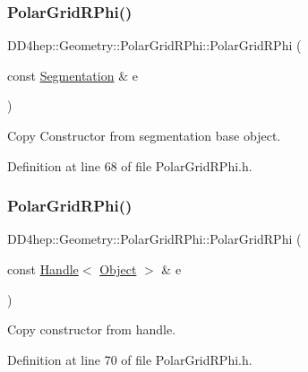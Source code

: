 \subsubsection{\texorpdfstring{Polar\+Grid\+R\+Phi()}{PolarGridRPhi()}\hspace{0.1cm}{\footnotesize\ttfamily [3/5]}}
{\footnotesize\ttfamily D\+D4hep\+::\+Geometry\+::\+Polar\+Grid\+R\+Phi\+::\+Polar\+Grid\+R\+Phi (\begin{DoxyParamCaption}\item[{const \hyperlink{class_d_d4hep_1_1_geometry_1_1_segmentation}{Segmentation} \&}]{e }\end{DoxyParamCaption})\hspace{0.3cm}{\ttfamily [inline]}}



Copy Constructor from segmentation base object. 



Definition at line 68 of file Polar\+Grid\+R\+Phi.\+h.

\hypertarget{class_d_d4hep_1_1_geometry_1_1_polar_grid_r_phi_ab27807b9812126c2574356c71dee5c15}{}\label{class_d_d4hep_1_1_geometry_1_1_polar_grid_r_phi_ab27807b9812126c2574356c71dee5c15} 
\subsubsection{\texorpdfstring{Polar\+Grid\+R\+Phi()}{PolarGridRPhi()}\hspace{0.1cm}{\footnotesize\ttfamily [4/5]}}
{\footnotesize\ttfamily D\+D4hep\+::\+Geometry\+::\+Polar\+Grid\+R\+Phi\+::\+Polar\+Grid\+R\+Phi (\begin{DoxyParamCaption}\item[{const \hyperlink{class_d_d4hep_1_1_handle}{Handle}$<$ \hyperlink{class_d_d4hep_1_1_geometry_1_1_polar_grid_r_phi_aebd15faef8872b8331cb2a153d5665bd}{Object} $>$ \&}]{e }\end{DoxyParamCaption})\hspace{0.3cm}{\ttfamily [inline]}}



Copy constructor from handle. 



Definition at line 70 of file Polar\+Grid\+R\+Phi.\+h.

